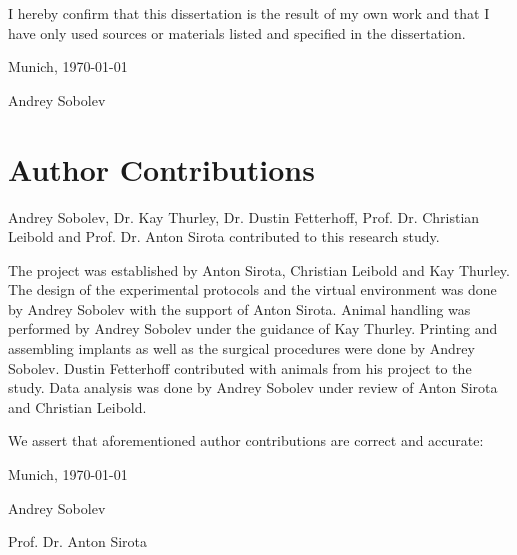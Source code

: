 I hereby confirm that this dissertation is the result of my own work and that I have only used sources or materials listed and specified in the dissertation.


\vspace{0.3in}

\noindent Munich, \today

\vspace{1in}

\noindent Andrey Sobolev


\chapter{Author Contributions}
Andrey Sobolev, Dr. Kay Thurley, Dr. Dustin Fetterhoff, Prof. Dr. Christian Leibold and Prof. Dr. Anton Sirota contributed to this research study.

The project was established by Anton Sirota, Christian Leibold and Kay Thurley. The design of the experimental protocols and the virtual environment was done by Andrey Sobolev with the support of Anton Sirota. Animal handling was performed by Andrey Sobolev under the guidance of Kay Thurley. Printing and assembling implants as well as the surgical procedures were done by Andrey Sobolev. Dustin Fetterhoff contributed with animals from his project to the study. Data analysis was done by Andrey Sobolev under review of Anton Sirota and Christian Leibold.

We assert that aforementioned author contributions are correct and accurate:

\vspace{0.3in}

\noindent Munich, \today

\vspace{0.5in}

\noindent Andrey Sobolev

\vspace{0.5in}

\noindent Prof. Dr. Anton Sirota
